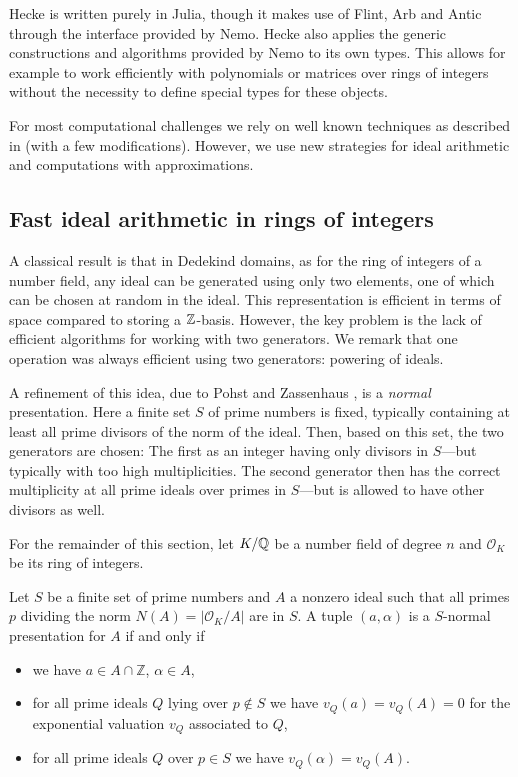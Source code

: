 \documentclass{sig-alternate-05-2015}
\begin{document}
Hecke is written purely in Julia, though it makes use of Flint, Arb and Antic through the interface provided by Nemo.
Hecke also applies the generic constructions and algorithms provided by Nemo to its own types. This allows for example to
work efficiently with polynomials or matrices over rings of integers without the necessity to define special types for these objects.

For most computational challenges we rely on well known techniques as described in \cite{Cohen1993, Pohst1997, Belabas2004}
(with a few modifications). However, we use new strategies for ideal arithmetic and computations with approximations.

\subsection{Fast ideal arithmetic in rings of integers}

A classical result is that in Dedekind domains, as for the ring of integers of a number field, any
ideal can be generated using only two elements, one of which can be chosen
at random in the ideal. This representation is efficient in terms of space compared to storing a
$\mathbb{Z}$-basis. However, the key problem is the lack of
efficient algorithms for working with two generators. We remark that one
operation was always efficient using two generators: powering of ideals.

A refinement of this idea, due to Pohst and Zassenhaus \cite[p. 400]{Pohst1997}, is a 
\textit{normal} presentation. Here a finite set $S$ of prime numbers
is fixed, typically containing at least all prime divisors of the norm of the ideal. Then,
based on this set, the two generators are chosen: The first as an integer
having only divisors in $S$---but typically with too high multiplicities.
The second generator then has the correct multiplicity at all prime ideals
over primes in $S$---but is allowed to have other divisors as well.

For the remainder of this section, let $K/\mathbb{Q}$ be a number field of
degree $n$ and $\mathcal O_K$ be its ring of integers.

\begin{definition}
Let $S$ be a finite set of prime numbers and $A$ a nonzero ideal such that
all primes $p$ dividing the norm $N(A) = |\mathcal O_K/A|$ are in $S$.
A tuple $(a, \alpha)$ is a $S$-normal presentation for $A$ if and only if
\begin{itemize}
\setlength{\itemsep}{1pt}
\setlength{\parskip}{0pt}
\setlength{\parsep}{0pt}
\item we have $a\in A\cap \mathbb Z$, $\alpha\in A$,
\item for all prime ideals $Q$ lying over $p\not\in S$ we have $v_Q(a)= v_Q(A) = 0$
  for the exponential valuation $v_Q$ associated to $Q$,
\item for all prime ideals $Q$ over $p\in S$ we have $v_Q(\alpha) = v_Q(A)$.
\end{itemize}
\end{definition}
\end{document}
